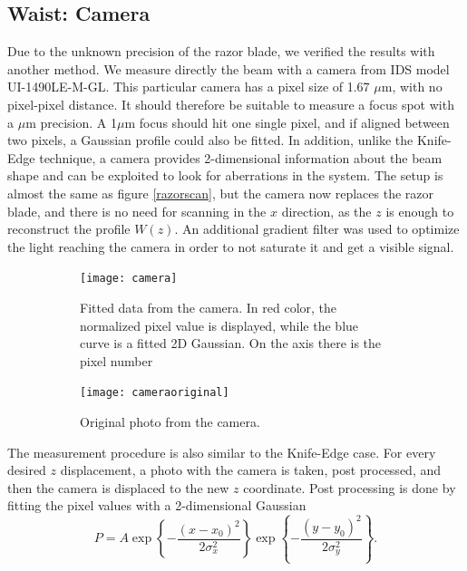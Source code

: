 \subsection{Waist: Camera}
\label{waistcamera}
Due to the unknown precision of the razor blade, we verified the results with another method. We measure directly the beam with a camera from IDS model UI-1490LE-M-GL. This particular camera has a pixel size of 1.67 $\mu$m, with no pixel-pixel distance. It should therefore be suitable to measure a focus spot with a $\mu$m precision. A 1$\mu$m focus should hit one single pixel, and if aligned between two pixels, a Gaussian profile could also be fitted.
In addition, unlike the Knife-Edge technique, a camera provides 2-dimensional information about the beam shape and can be exploited to look for aberrations in the system. The setup is almost the same as figure \ref{razorscan}, but the camera now replaces the razor blade, and there is no need for scanning in the $x$ direction, as the $z$ is enough to reconstruct the profile $W(z)$. An additional gradient filter was used to optimize the light reaching the camera in order to not saturate it and get a visible signal.
\begin{figure}
     \centering
     \begin{subfigure}[b]{0.67\textwidth}
         \centering
         \texttt{[image: camera]}
          \caption{Fitted data from the camera. In red color, the normalized pixel value is displayed, while the blue curve is a fitted 2D Gaussian. On the axis there is the pixel number}
     \end{subfigure}
     \hfill
     \begin{subfigure}[b]{0.3\textwidth}
         \centering
         \texttt{[image: cameraoriginal]}
        \vspace{5em}
         \caption{Original photo from the camera.}

     \end{subfigure}
        \caption{}
       \label{fig:camera}
\end{figure}
The measurement procedure is also similar to the Knife-Edge case. For every desired $z$ displacement, a photo with the camera is taken, post processed, and then the camera is displaced to the new $z$ coordinate. Post processing is done by fitting the pixel values with a 2-dimensional Gaussian
\begin{equation}
P = A \exp\left\{-\frac{(x-x_0)^2}{2\sigma_x^2}\right\} \exp\left\{-\frac{(y-y_0)^2}{2\sigma_y^2} \right\}.
\end{equation}
